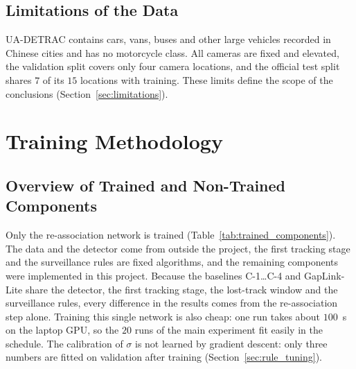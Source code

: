 \subsection{Limitations of the Data}
\label{sec:data_limitations}

UA-DETRAC contains cars, vans, buses and other large vehicles recorded in Chinese cities and has no motorcycle class. All cameras are fixed and elevated, the validation split covers only four camera locations, and the official test split shares $7$ of its $15$ locations with training. These limits define the scope of the conclusions (Section~\ref{sec:limitations}).

\section{Training Methodology}
\label{sec:training_methodology}

\subsection{Overview of Trained and Non-Trained Components}
\label{sec:trained_components}

Only the re-association network is trained (Table~\ref{tab:trained_components}). The data and the detector come from outside the project, the first tracking stage and the surveillance rules are fixed algorithms, and the remaining components were implemented in this project. Because the baselines C-1\dots C-4 and GapLink-Lite share the detector, the first tracking stage, the lost-track window and the surveillance rules, every difference in the results comes from the re-association step alone. Training this single network is also cheap: one run takes about $100$~s on the laptop GPU, so the $20$ runs of the main experiment fit easily in the schedule. The calibration of $\sigma$ is not learned by gradient descent: only three numbers are fitted on validation after training (Section~\ref{sec:rule_tuning}).

